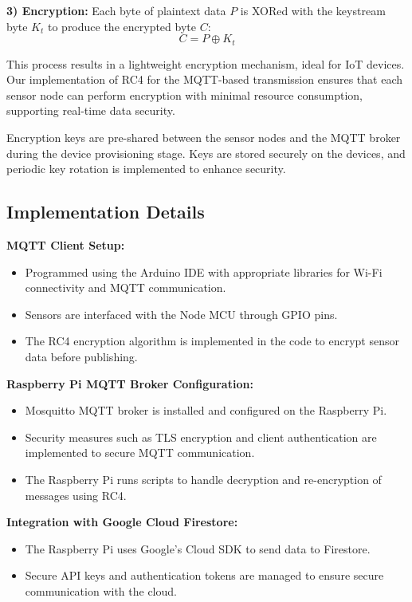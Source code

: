 \documentclass[conference]{IEEEtran}
\begin{document}
\textbf{3) Encryption:} Each byte of plaintext data \( P \) is XORed with the keystream byte \( K_t \) to produce the encrypted byte \( C \):
\begin{equation}
    C = P \oplus K_t
\end{equation}

This process results in a lightweight encryption mechanism, ideal for IoT devices. Our implementation of RC4 for the MQTT-based transmission ensures that each sensor node can perform encryption with minimal resource consumption, supporting real-time data security.

Encryption keys are pre-shared between the sensor nodes and the MQTT broker during the device provisioning stage. Keys are stored securely on the devices, and periodic key rotation is implemented to enhance security.

\subsection{Implementation Details}

\textbf{MQTT Client Setup:}
\begin{itemize}
    \item Programmed using the Arduino IDE with appropriate libraries for Wi-Fi connectivity and MQTT communication.
    \item Sensors are interfaced with the Node MCU through GPIO pins.
    \item The RC4 encryption algorithm is implemented in the code to encrypt sensor data before publishing.
\end{itemize}

\textbf{Raspberry Pi MQTT Broker Configuration:}
\begin{itemize}
    \item Mosquitto MQTT broker is installed and configured on the Raspberry Pi.
    \item Security measures such as TLS encryption and client authentication are implemented to secure MQTT communication.
    \item The Raspberry Pi runs scripts to handle decryption and re-encryption of messages using RC4.
\end{itemize}

\textbf{Integration with Google Cloud Firestore:}
\begin{itemize}
    \item The Raspberry Pi uses Google's Cloud SDK to send data to Firestore.
    \item Secure API keys and authentication tokens are managed to ensure secure communication with the cloud.
\end{itemize}
\end{document}
